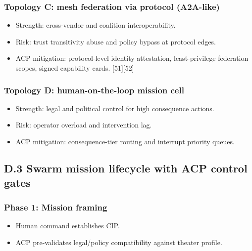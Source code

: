 \documentclass[
]{article}
\providecommand{\tightlist}{%
  \setlength{\itemsep}{0pt}\setlength{\parskip}{0pt}}
\begin{document}
\hypertarget{topology-c-mesh-federation-via-protocol-a2a-like}{%
\subsubsection{Topology C: mesh federation via protocol
(A2A-like)}\label{topology-c-mesh-federation-via-protocol-a2a-like}}

\begin{itemize}
\tightlist
\item
  Strength: cross-vendor and coalition interoperability.
\item
  Risk: trust transitivity abuse and policy bypass at protocol edges.
\item
  ACP mitigation: protocol-level identity attestation, least-privilege
  federation scopes, signed capability cards. {[}51{]}{[}52{]}
\end{itemize}

\hypertarget{topology-d-human-on-the-loop-mission-cell}{%
\subsubsection{Topology D: human-on-the-loop mission
cell}\label{topology-d-human-on-the-loop-mission-cell}}

\begin{itemize}
\tightlist
\item
  Strength: legal and political control for high consequence actions.
\item
  Risk: operator overload and intervention lag.
\item
  ACP mitigation: consequence-tier routing and interrupt priority
  queues.
\end{itemize}

\hypertarget{d.3-swarm-mission-lifecycle-with-acp-control-gates}{%
\subsection{D.3 Swarm mission lifecycle with ACP control
gates}\label{d.3-swarm-mission-lifecycle-with-acp-control-gates}}

\hypertarget{phase-1-mission-framing}{%
\subsubsection{Phase 1: Mission framing}\label{phase-1-mission-framing}}

\begin{itemize}
\tightlist
\item
  Human command establishes CIP.
\item
  ACP pre-validates legal/policy compatibility against theater profile.
\end{itemize}
\end{document}
